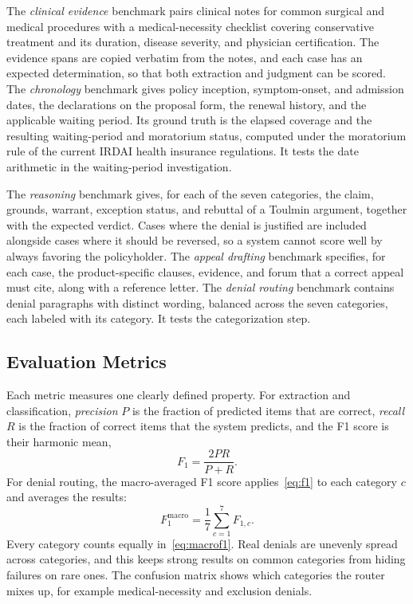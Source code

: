 \documentclass[conference]{IEEEtran}
\begin{document}
The \emph{clinical evidence} benchmark pairs clinical notes for common surgical and medical procedures with a medical-necessity checklist covering conservative treatment and its duration, disease severity, and physician certification. The evidence spans are copied verbatim from the notes, and each case has an expected determination, so that both extraction and judgment can be scored. The \emph{chronology} benchmark gives policy inception, symptom-onset, and admission dates, the declarations on the proposal form, the renewal history, and the applicable waiting period. Its ground truth is the elapsed coverage and the resulting waiting-period and moratorium status, computed under the moratorium rule of the current IRDAI health insurance regulations. It tests the date arithmetic in the waiting-period investigation.

The \emph{reasoning} benchmark gives, for each of the seven categories, the claim, grounds, warrant, exception status, and rebuttal of a Toulmin argument, together with the expected verdict. Cases where the denial is justified are included alongside cases where it should be reversed, so a system cannot score well by always favoring the policyholder. The \emph{appeal drafting} benchmark specifies, for each case, the product-specific clauses, evidence, and forum that a correct appeal must cite, along with a reference letter. The \emph{denial routing} benchmark contains denial paragraphs with distinct wording, balanced across the seven categories, each labeled with its category. It tests the categorization step.

\subsection{Evaluation Metrics}
Each metric measures one clearly defined property. For extraction and classification, \emph{precision} $P$ is the fraction of predicted items that are correct, \emph{recall} $R$ is the fraction of correct items that the system predicts, and the F1 score is their harmonic mean,
\begin{equation}
F_1 = \frac{2PR}{P+R}.
\label{eq:f1}
\end{equation}
For denial routing, the macro-averaged F1 score applies~\eqref{eq:f1} to each category $c$ and averages the results:
\begin{equation}
F_1^{\text{macro}} = \frac{1}{7}\sum_{c=1}^{7} F_{1,c}.
\label{eq:macrof1}
\end{equation}
Every category counts equally in~\eqref{eq:macrof1}. Real denials are unevenly spread across categories, and this keeps strong results on common categories from hiding failures on rare ones. The confusion matrix shows which categories the router mixes up, for example medical-necessity and exclusion denials.
\end{document}
